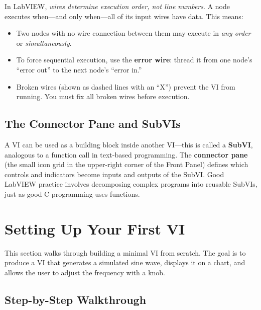 \begin{keyconceptbox}
In LabVIEW, \emph{wires determine execution order, not line numbers}. A node executes when---and only when---all of its input wires have data. This means:
\begin{itemize}[nosep,leftmargin=1.5em]
\item Two nodes with no wire connection between them may execute in \emph{any order} or \emph{simultaneously}.
\item To force sequential execution, use the \textbf{error wire}: thread it from one node's ``error out'' to the next node's ``error in.''
\item Broken wires (shown as dashed lines with an ``X'') prevent the VI from running. You must fix all broken wires before execution.
\end{itemize}
\end{keyconceptbox}

\subsection{The Connector Pane and SubVIs}

A VI can be used as a building block inside another VI---this is called a \textbf{SubVI}, analogous to a function call in text-based programming. The \textbf{connector pane} (the small icon grid in the upper-right corner of the Front Panel) defines which controls and indicators become inputs and outputs of the SubVI. Good LabVIEW practice involves decomposing complex programs into reusable SubVIs, just as good C programming uses functions.

\section{Setting Up Your First VI}
\label{sec:lv_firstvi}

This section walks through building a minimal VI from scratch. The goal is to produce a VI that generates a simulated sine wave, displays it on a chart, and allows the user to adjust the frequency with a knob.

\subsection{Step-by-Step Walkthrough}

